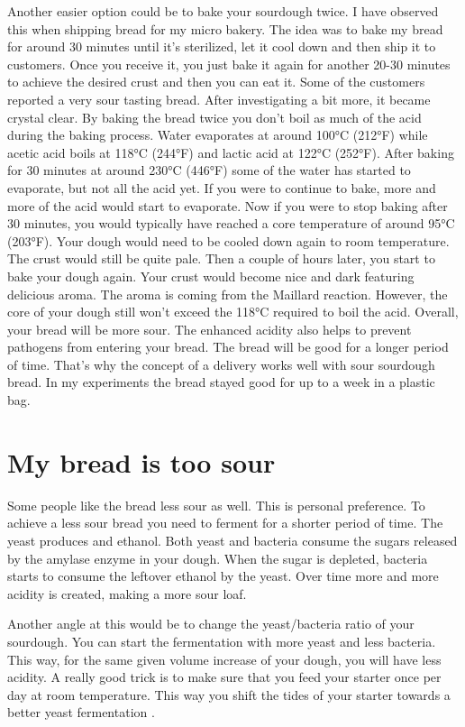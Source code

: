 Another easier option could be to bake your sourdough
twice. I have observed this when shipping bread for my micro
bakery. The idea was to bake my bread for around 30 minutes
until it's sterilized, let it cool down and then ship it
to customers. Once you receive it, you just bake it again
for another 20-30 minutes to achieve the desired crust and
then you can eat it. Some of the customers reported a very sour
tasting bread. After investigating a bit more, it became
crystal clear. By baking the bread twice you don't boil
as much of the acid during the baking process. Water
evaporates at around 100°C (212°F) while acetic acid boils at
118°C (244°F) and lactic acid at 122°C (252°F). After baking for 30 minutes
at around 230°C (446°F) some of the water has started to evaporate,
but not all the acid yet. If you were to continue to bake, more
and more of the acid would start to evaporate. Now if you were
to stop baking after 30 minutes, you would typically have reached
a core temperature of around 95°C (203°F). Your dough would need
to be cooled down again to room temperature. The crust would
still be quite pale. Then a couple of hours later, you start
to bake your dough again. Your crust would become nice and
dark featuring delicious aroma. The aroma is coming from the
Maillard reaction. However, the core of your dough still won't
exceed the 118°C required to boil the acid. Overall, your
bread will be more sour. The enhanced acidity also helps
to prevent pathogens from entering your bread. The bread
will be good for a longer period of time. That's why
the concept of a delivery works well with sour sourdough bread.
In my experiments the bread stayed good for up to a week
in a plastic bag.

\section{My bread is too sour}

Some people like the bread less sour as well. This
is personal preference. To achieve a less sour bread
you need to ferment for a shorter period of time.
The yeast produces  and ethanol. Both yeast and
bacteria consume the sugars released by the amylase enzyme
in your dough. When the sugar is depleted, bacteria starts to
consume the leftover ethanol by the yeast. Over time more
and more acidity is created, making a more sour loaf.

Another angle at this would be to change the yeast/bacteria
ratio of your sourdough. You can start the fermentation with
more yeast and less bacteria. This way, for the same given
volume increase of your dough, you will have less acidity.
A really good trick is to make sure that you feed your starter
once per day at room temperature. This way you shift
the tides of your starter towards a better yeast fermentation \cite*{more+active+starter}.

